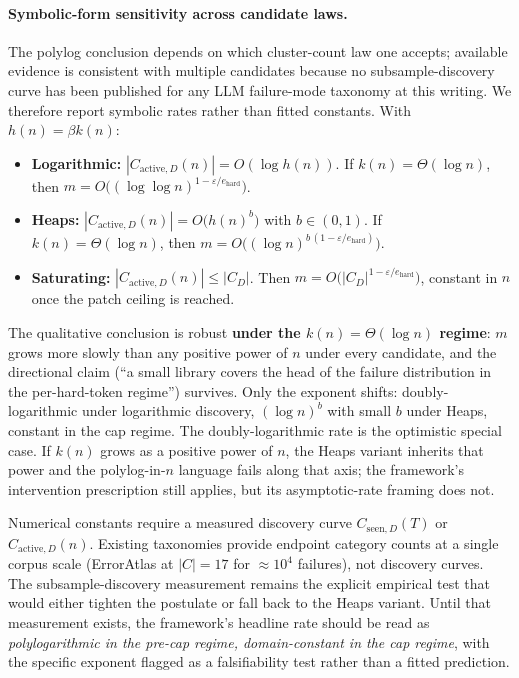 \documentclass{article}
\theoremstyle{taeplain}
\theoremstyle{taedefn}
\newcommand{\teApprox}{\ensuremath{\approx}}
\begin{document}
\paragraph{Symbolic-form sensitivity across candidate laws.}
The polylog conclusion depends on which cluster-count law one accepts; available evidence is consistent with multiple candidates because no subsample-discovery curve has been published for any LLM failure-mode taxonomy at this writing. We therefore report symbolic rates rather than fitted constants. With $h(n) = \beta k(n)$:

\begin{itemize}
\setlength{\itemsep}{1pt}
\item \textbf{Logarithmic:} $|C_{\text{active},D}(n)| = O(\log h(n))$. If $k(n) = \Theta(\log n)$, then $m = O\bigl((\log\log n)^{1 - \varepsilon / e_{\text{hard}}}\bigr)$.
\item \textbf{Heaps:} $|C_{\text{active},D}(n)| = O\bigl(h(n)^b\bigr)$ with $b \in (0, 1)$. If $k(n) = \Theta(\log n)$, then $m = O\bigl((\log n)^{b\,(1 - \varepsilon / e_{\text{hard}})}\bigr)$.
\item \textbf{Saturating:} $|C_{\text{active},D}(n)| \leq |C_D|$. Then $m = O\bigl(|C_D|^{1 - \varepsilon / e_{\text{hard}}}\bigr)$, constant in $n$ once the patch ceiling is reached.
\end{itemize}

The qualitative conclusion is robust \textbf{under the $k(n) = \Theta(\log n)$ regime}: $m$ grows more slowly than any positive power of $n$ under every candidate, and the directional claim (``a small library covers the head of the failure distribution in the per-hard-token regime'') survives. Only the exponent shifts: doubly-logarithmic under logarithmic discovery, $(\log n)^b$ with small $b$ under Heaps, constant in the cap regime. The doubly-logarithmic rate is the optimistic special case. If $k(n)$ grows as a positive power of $n$, the Heaps variant inherits that power and the polylog-in-$n$ language fails along that axis; the framework's intervention prescription still applies, but its asymptotic-rate framing does not.

Numerical constants require a measured discovery curve $C_{\text{seen},D}(T)$ or $C_{\text{active},D}(n)$. Existing taxonomies provide endpoint category counts at a single corpus scale (ErrorAtlas at $|C|=17$ for $\teApprox 10^4$ failures), not discovery curves. The subsample-discovery measurement remains the explicit empirical test that would either tighten the postulate or fall back to the Heaps variant. Until that measurement exists, the framework's headline rate should be read as \emph{polylogarithmic in the pre-cap regime, domain-constant in the cap regime}, with the specific exponent flagged as a falsifiability test rather than a fitted prediction.
\end{document}
